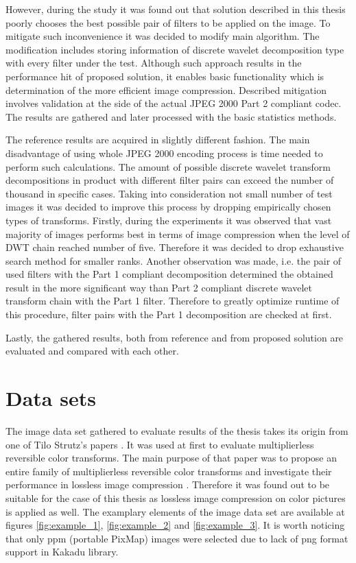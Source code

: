 However, during the study it was found out that solution described in this thesis poorly chooses
the best possible pair of filters to be applied on the image. To mitigate such inconvenience it
was decided to modify main algorithm. The modification includes storing information of discrete
wavelet decomposition type with every filter under the test. Although such approach results in
the performance hit of proposed solution, it enables basic functionality which is determination
of the more efficient image compression. Described mitigation involves validation at the side of
the actual JPEG 2000 Part 2 compliant codec. The results are gathered and later processed with
the basic statistics methods.

The reference results are acquired in slightly different fashion. The main disadvantage of using
whole JPEG 2000 encoding process is time needed to perform such calculations. The amount of possible
discrete wavelet transform decompositions in product with different filter pairs can exceed the
number of thousand in specific cases. Taking into consideration not small number of test images
it was decided to improve this process by dropping empirically chosen types of transforms. Firstly,
during the experiments it was observed that vast majority of images performs best in terms of
image compression when the level of DWT chain reached number of five. Therefore it was decided to
drop exhaustive search method for smaller ranks. Another observation was made, i.e. the pair of used
filters with the Part 1 compliant decomposition determined the obtained result in the more significant
way than Part 2 compliant discrete wavelet transform chain with the Part 1 filter. Therefore
to greatly optimize runtime of this procedure, filter pairs with the Part 1 decomposition are
checked at first.

Lastly, the gathered results, both from reference and from proposed solution are evaluated and
compared with each other. 

\section{Data sets}

The image data set gathered to evaluate results of the thesis takes its origin from one of
Tilo Strutz's papers \cite{ref_images}. It was used at first to evaluate multiplierless reversible
color transforms. The main purpose of that paper was to propose an entire family of multiplierless
reversible color transforms and investigate their performance in lossless image compression \cite{multiplierless_rct}.
Therefore it was found out to be suitable for the case of this thesis as lossless image compression
on color pictures is applied as well. The examplary elements of the image data set are available at
figures \ref{fig:example_1}, \ref{fig:example_2} and \ref{fig:example_3}. It is worth noticing that only ppm
(portable PixMap) images were selected due to lack of png format support in Kakadu library.

